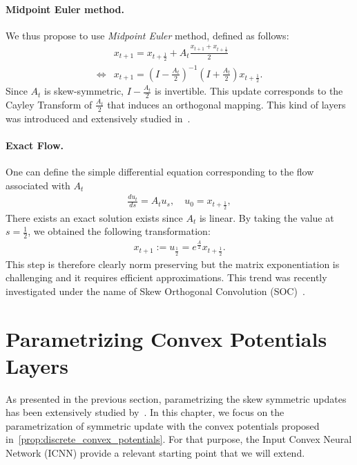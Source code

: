 \paragraph{Midpoint Euler method.}
We thus propose to use \emph{Midpoint Euler} method, defined as follows:
\begin{align*}
&x_{t+1} = x_{t+\frac12} +A_t \frac{x_{t+1}+x_{t+\frac12}}{2}\\
\iff&x_{t+1} = \left(I-\frac{A_t}{2}\right)^{-1}\left(I+\frac{A_t}{2}\right)x_{t+\frac12}.
\end{align*} 
Since $A_t$ is skew-symmetric, $I-\frac{A_t}{2}$ is invertible. This update corresponds to the Cayley Transform of $\frac{A_t}{2}$ that induces an orthogonal mapping. 
This kind of layers was introduced and extensively studied in~\citet{trockman2021orthogonalizing}.  


\paragraph{Exact Flow.} One can define the simple differential equation corresponding to the flow associated with $A_t$  
\begin{align*}
        \frac{du_t}{ds} = A_t u_s,\quad u_0 = x_{t+\frac12},
\end{align*}
There exists an exact solution exists since $A_t$ is linear. By taking the value at $s=\frac12$, we obtained the following transformation:  
 \begin{align*}
x_{t+1} := u_{\frac12}=e^{\frac{A}{2}} x_{t+\frac12}.
\end{align*}
This step is therefore clearly norm preserving but the matrix exponentiation is challenging and it requires efficient approximations. This trend was recently investigated under the name of Skew Orthogonal Convolution (SOC)~\cite{skew2021sahil}.


\section{Parametrizing Convex Potentials Layers}
\label{sec:param}

As presented in the previous section, parametrizing the skew symmetric updates has been extensively studied by~\citet{trockman2021orthogonalizing,skew2021sahil}. In this chapter, we focus on  the parametrization of symmetric update with the convex potentials proposed in~\ref{prop:discrete_convex_potentials}. For that purpose, the Input Convex Neural Network (ICNN) \citep{amos2017input} provide a relevant starting point that we will extend. 


